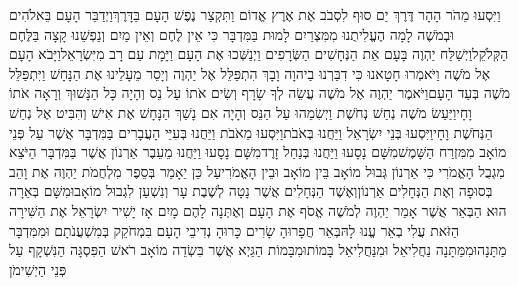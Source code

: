 \documentclass[../main/main.tex]{subfiles}
\begin{document}
\begin{multicols}{\ncols}
וַיִּסְעוּ מֵהֹר הָהָר דֶּרֶךְ יַם סוּף לִסְבֹב אֶת אֶרֶץ אֱדוֹם וַתִּקְצַר נֶפֶשׁ הָעָם בַּדָּרֶךְ\PreVerseSpace{}וַיְדַבֵּר הָעָם בֵּאלֹהִים וּבְמֹשֶׁה לָמָה הֶעֱלִיתֻנוּ מִמִּצְרַיִם לָמוּת בַּמִּדְבָּר כִּי אֵין לֶחֶם וְאֵין מַיִם וְנַפְשֵׁנוּ קָצָה בַּלֶּחֶם הַקְּלֹקֵל\PreVerseSpace{}וַיְשַׁלַּח יַהְוֶה בָּעָם אֵת הַנְּחָשִׁים הַשְּׂרָפִים וַיְנַשְּׁכוּ אֶת הָעָם וַיָּמָת עַם רָב מִיִּשְׂרָאֵל\PreVerseSpace{}וַיָּבֹא הָעָם אֶל מֹשֶׁה וַיֹּאמְרוּ חָטָאנוּ כִּי דִבַּרְנוּ בַיהוָה וָבָךְ הִתְפַּלֵּל אֶל יַהְוֶה וְיָסֵר מֵעָלֵינוּ אֶת הַנָּחָשׁ וַיִּתְפַּלֵּל מֹשֶׁה בְּעַד הָעָם\PreVerseSpace{}וַיֹּאמֶר יַהְוֶה אֶל מֹשֶׁה עֲשֵׂה לְךָ שָׂרָף וְשִׂים אֹתוֹ עַל נֵס וְהָיָה כָּל הַנָּשׁוּךְ וְרָאָה אֹתוֹ וָחָי\PreVerseSpace{}וַיַּעַשׂ מֹשֶׁה נְחַשׁ נְחֹשֶׁת וַיְשִׂמֵהוּ עַל הַנֵּס וְהָיָה אִם נָשַׁךְ הַנָּחָשׁ אֶת אִישׁ וְהִבִּיט אֶל נְחַשׁ הַנְּחֹשֶׁת וָחָי\PreVerseSpace{}וַיִּסְעוּ בְּנֵי יִשְׂרָאֵל וַיַּחֲנוּ בְּאֹבֹת\PreVerseSpace{}וַיִּסְעוּ מֵאֹבֹת וַיַּחֲנוּ בְּעִיֵּי הָעֲבָרִים בַּמִּדְבָּר אֲשֶׁר עַל פְּנֵי מוֹאָב מִמִּזְרַח הַשָּׁמֶשׁ\PreVerseSpace{}מִשָּׁם נָסָעוּ וַיַּחֲנוּ בְּנַחַל זָרֶד\PreVerseSpace{}מִשָּׁם נָסָעוּ וַיַּחֲנוּ מֵעֵבֶר אַרְנוֹן אֲשֶׁר בַּמִּדְבָּר הַיֹּצֵא מִגְבֻל הָאֱמֹרִי כִּי אַרְנוֹן גְּבוּל מוֹאָב בֵּין מוֹאָב וּבֵין הָאֱמֹרִי\PreVerseSpace{}עַל כֵּן יֵאָמַר בְּסֵפֶר מִלְחֲמֹת יַהְוֶה אֶת וָהֵב בְּסוּפָה וְאֶת הַנְּחָלִים אַרְנוֹן\PreVerseSpace{}וְאֶשֶׁד הַנְּחָלִים אֲשֶׁר נָטָה לְשֶׁבֶת עָר וְנִשְׁעַן לִגְבוּל מוֹאָב\PreVerseSpace{}וּמִשָּׁם בְּאֵרָה הוּא הַבְּאֵר אֲשֶׁר אָמַר יַהְוֶה לְמֹשֶׁה אֱסֹף אֶת הָעָם וְאֶתְּנָה לָהֶם מָיִם \ClosedSection{}אָז יָשִׁיר יִשְׂרָאֵל אֶת הַשִּׁירָה הַזֹּאת עֲלִי בְאֵר עֱנוּ לָהּ\PreVerseSpace{}בְּאֵר חֲפָרוּהָ שָׂרִים כָּרוּהָ נְדִיבֵי הָעָם בִּמְחֹקֵק בְּמִשְׁעֲנֹתָם וּמִמִּדְבָּר מַתָּנָה\PreVerseSpace{}וּמִמַּתָּנָה נַחֲלִיאֵל וּמִנַּחֲלִיאֵל בָּמוֹת\PreVerseSpace{}וּמִבָּמוֹת הַגַּיְא אֲשֶׁר בִּשְׂדֵה מוֹאָב רֹאשׁ הַפִּסְגָּה הַנִּשְׁקָף\SubEnd{} עַל פְּנֵי הַיְשִׁימֹן\OpenSection{}\par

\end{multicols}
\end{document}
